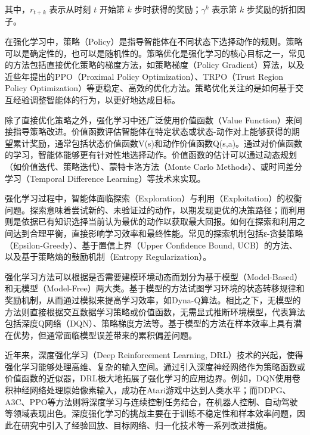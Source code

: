其中，\( r_{t+k} \) 表示从时刻 \( t \) 开始第 \( k \) 步时获得的奖励；\( \gamma^k \) 表示第 \( k \) 步奖励的折扣因子。

在强化学习中，策略（Policy）是指导智能体在不同状态下选择动作的规则。策略可以是确定性的，也可以是随机性的。策略优化是强化学习的核心目标之一，常见的方法包括直接优化策略的梯度方法，如策略梯度（Policy Gradient）算法\cite{silver2014deterministic}，以及近些年提出的PPO\cite{yu2022surprising}（Proximal Policy Optimization）、TRPO\cite{schulman2015trust}（Trust Region Policy Optimization）等更稳定、高效的优化方法。策略优化关注的是如何基于交互经验调整智能体的行为，以更好地达成目标。

除了直接优化策略之外，强化学习中还广泛使用价值函数（Value Function）来间接指导策略改进。价值函数评估智能体在特定状态或状态-动作对上能够获得的期望累计奖励，通常包括状态价值函数V(s)和动作价值函数Q(s,a)。通过对价值函数的学习，智能体能够更有针对性地选择动作。价值函数的估计可以通过动态规划（如价值迭代、策略迭代）、蒙特卡洛方法\cite{chaslot2010monte}（Monte Carlo Methods）、或时间差分学习\cite{tesauro1991practical}（Temporal Difference Learning）等技术来实现。

强化学习过程中，智能体面临探索（Exploration）与利用（Exploitation）的权衡问题。探索意味着尝试新的、未验证过的动作，以期发现更优的决策路径；而利用则是依据已有知识选择当前认为最优的动作以获取最大回报。如何在探索和利用之间达到合理平衡，直接影响学习效率和最终性能。常见的探索机制包括ε-贪婪策略\cite{wunder2010classes}（Epsilon-Greedy）、基于置信上界\cite{auer2002finite}（Upper Confidence Bound, UCB）的方法、以及基于策略熵的鼓励机制（Entropy Regularization）。

强化学习方法可以根据是否需要建模环境动态而划分为基于模型（Model-Based）和无模型（Model-Free）两大类。基于模型的方法试图学习环境的状态转移规律和奖励机制，从而通过模拟来提高学习效率，如Dyna-Q\cite{peng2018deep}算法。相比之下，无模型的方法则直接根据交互数据学习策略或价值函数，无需显式推断环境模型，代表算法包括深度Q网络（DQN）、策略梯度方法等。基于模型的方法在样本效率上具有潜在优势，但通常面临模型误差带来的累积偏差问题。

近年来，深度强化学习\cite{li2019deep}（Deep Reinforcement Learning, DRL）技术的兴起，使得强化学习能够处理高维、复杂的输入空间。通过引入深度神经网络作为策略函数或价值函数的近似器，DRL极大地拓展了强化学习的应用边界。例如，DQN使用卷积神经网络处理原始像素输入，成功在Atari游戏中达到人类水平；而DDPG、A3C、PPO等方法则将深度学习与连续控制任务结合，在机器人控制、自动驾驶等领域表现出色。深度强化学习的挑战主要在于训练不稳定性和样本效率问题，因此在研究中引入了经验回放、目标网络、归一化技术等一系列改进措施。

